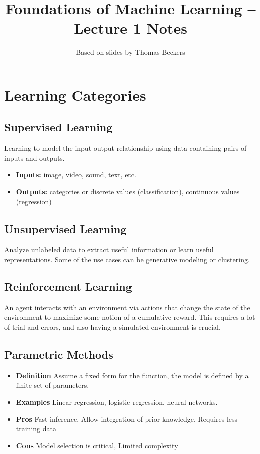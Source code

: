 \documentclass[11pt]{article}
\title{Foundations of Machine Learning -- Lecture 1 Notes}
\author{Based on slides by Thomas Beckers}
\date{}
\begin{document}
\maketitle

\section*{Learning Categories}
\subsection*{Supervised Learning}
Learning to model the input-output relationship using data
containing pairs of inputs and outputs.
\begin{itemize}
	\item \textbf{Inputs:} image, video, sound, text, etc.
	\item \textbf{Outputs:} categories or discrete values (classification),
	      continuous values (regression)
\end{itemize}


\subsection*{Unsupervised Learning}
Analyze unlabeled data to extract useful information or learn useful representations.
Some of the use cases can be generative modeling or clustering.


\subsection*{Reinforcement Learning}
An agent interacts with an environment via actions that change
the state of the environment to maximize some notion of a cumulative reward.
This requires a lot of trial and errors, and also having a simulated environment is crucial.


\subsection*{Parametric Methods}
\begin{itemize}
	\item \textbf{Definition}
	      Assume a fixed form for the function, the model is defined by a finite set of parameters.
	\item \textbf{Examples}
	      Linear regression, logistic regression, neural networks.
	\item \textbf{Pros}
	      Fast inference, Allow integration of prior knowledge, Requires less training data
	\item \textbf{Cons}
	      Model selection is critical, Limited complexity

\end{itemize}
\end{document}
